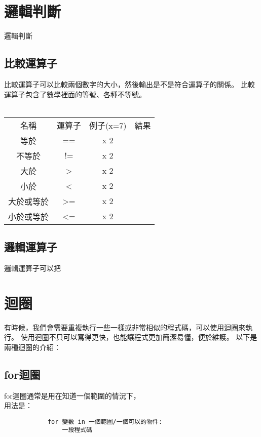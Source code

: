 \documentclass{article}
\begin{document}
\begin{large}
    
    \section{邏輯判斷}
    
        邏輯判斷
    
        \subsection{比較運算子}
    
        比較運算子可以比較兩個數字的大小，然後輸出是不是符合運算子的關係。
        比較運算子包含了數學裡面的等號、各種不等號。\\
        \\
        \begin{tabular}{ |c|c|c|c| } 
            \hline
            名稱 & 運算子 & 例子(x=7) & 結果 \\
            等於 & == & x  2 &  \\
            不等於 & != & x  2 &  \\
            大於 & > & x  2 &  \\
            小於 & < & x  2 &  \\
            大於或等於 & >= & x  2 &  \\
            小於或等於 & <= & x  2 &  \\
            \hline
        \end{tabular}
    
    
    
        \subsection{邏輯運算子}
    
        邏輯運算子可以把
    
    \section{迴圈}
    
        有時候，我們會需要重複執行一些一樣或非常相似的程式碼，可以使用迴圈來執行。
        使用迴圈不只可以寫得更快，也能讓程式更加簡潔易懂，便於維護。
        以下是兩種迴圈的介紹：
    
        \subsection{for迴圈}
    
        for迴圈通常是用在知道一個範圍的情況下，\\
        用法是：\\
        \begin{lstlisting}
            for 變數 in 一個範圍/一個可以的物件:
                一段程式碼
        \end{lstlisting}
    

\end{large}
\end{document}
